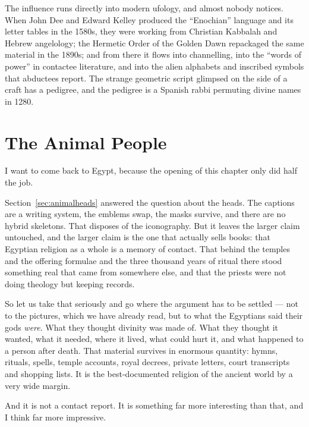 \begin{funfact}
The influence runs directly into modern ufology, and almost nobody notices. When John Dee and
Edward Kelley produced the ``Enochian'' language and its letter tables in the 1580s, they were
working from Christian Kabbalah and Hebrew angelology; the Hermetic Order of the Golden Dawn
repackaged the same material in the 1890s; and from there it flows into channelling, into the
``words of power'' in contactee literature, and into the alien alphabets and inscribed symbols that
abductees report. The strange geometric script glimpsed on the side of a craft has a pedigree, and
the pedigree is a Spanish rabbi permuting divine names in 1280.
\end{funfact}

\section{The Animal People}\label{sec:animalpeople}

I want to come back to Egypt, because the opening of this chapter only did half the job.

Section~\ref{sec:animalheads} answered the question about the heads. The captions are a writing
system, the emblems swap, the masks survive, and there are no hybrid skeletons. That disposes of
the iconography. But it leaves the larger claim untouched, and the larger claim is the one that
actually sells books: that Egyptian religion as a whole is a memory of contact. That behind the
temples and the offering formulae and the three thousand years of ritual there stood something
real that came from somewhere else, and that the priests were not doing theology but keeping
records.

So let us take that seriously and go where the argument has to be settled --- not to the pictures,
which we have already read, but to what the Egyptians said their gods \emph{were}. What they
thought divinity was made of. What they thought it wanted, what it needed, where it lived, what
could hurt it, and what happened to a person after death. That material survives in enormous
quantity: hymns, rituals, spells, temple accounts, royal decrees, private letters, court
transcripts and shopping lists. It is the best-documented religion of the ancient world by a very
wide margin.

And it is not a contact report. It is something far more interesting than that, and I think far
more impressive.

